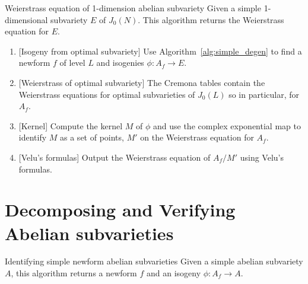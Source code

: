 \documentclass[11pt, proquest]{uwthesis}
\begin{document}
\begin{algorithm}{Weierstrass equation of 1-dimension abelian subvariety}%
    \label{alg:weierstrass}
    Given a simple 1-dimensional subvariety $E$ of $J_0(N)$. This algorithm
    returns the Weierstrass equation for $E$.
    \begin{enumerate}
        \item{}
            [Isogeny from optimal subvariety] Use
            Algorithm~\ref{alg:simple_degen} to find a newform $f$ of level
            $L$ and isogenies $\phi:A_f\to E$.
        \item{}
            [Weierstrass of optimal subvariety] The Cremona tables contain the
            Weierstrass equations for optimal subvarieties of $J_0(L)$ so in
            particular, for $A_f$.
        \item{}
            [Kernel] Compute the kernel $M$ of $\phi$ and use the complex
            exponential map to identify $M$ as a set of points, $M'$ on the
            Weierstrass equation for $A_f$.
        \item{}
            [Velu's formulas] Output the Weierstrass equation of $A_f/M'$ using
            Velu's formulas.
    \end{enumerate}
\end{algorithm}

\section{Decomposing and Verifying Abelian subvarieties}

\begin{algorithm}{Identifying simple newform abelian subvarieties}%
    \label{alg:identifying_simples}
    Given a simple abelian subvariety $A$, this algorithm returns a newform $f$ and
    an isogeny $\phi:A_f\to A$.
\end{algorithm}
\end{document}
